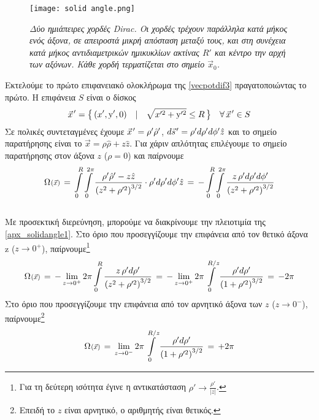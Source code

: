 \begin{figure}[h]
    \centering
    \texttt{[image: solid angle.png]}
    \caption{\textit{Δύο ημιάπειρες χορδές Dirac. Οι χορδές τρέχουν παράλληλα κατά μήκος ενός άξονα, σε απειροστά μικρή απόσταση μεταξύ τους, και στη συνέχεια κατά μήκος αντιδιαμετρικών ημικυκλίων ακτίνας $R '$ και κέντρο την αρχή των αξόνων. Κάθε χορδή τερματίζεται στο σημείο $\vec{x}_0$. %
    }}
    \label{fig:solidangle}
\end{figure}

Εκτελούμε το πρώτο επιφανειακό ολοκλήρωμα της \eqref{vecpotdif3} πραγατοποιώντας το πρώτο. Η επιφάνεια $S$ είναι ο δίσκος
\begin{equation*}
    \pvec{x}' = \big\{ \, (x',\y',0)\quad|\quad \sqrt{x'^2+\y'^2}\le R \, \big\} \quad \forall \, \pvec{x}'\in S
\end{equation*}
Σε πολικές συντεταγμένες έχουμε $\pvec{x}' = \rho'\hat{\rho}'$, %
$d\pvec{s}' = \rho' d\rho' d\phi' \hat{z}$ και το σημείο παρατήρησης είναι το $\vec{x} = \rho\hat{\rho}+z\hat{z}$. Για χάριν απλότητας επιλέγουμε το σημείο παρατήρησης στον άξονα $z$ ($\rho = 0$) και παίρνουμε
\begin{equation}\label{apx_solidangle1}
    \scafun{\Omega}{\vec{x}} \,=\, \int\limits_0^{R}\int\limits_0^{2\pi} \frac{\rho'\hat{\rho}'-z\hat{z}}{\left(z^2+\rho'^2\right)^{3/2}}\cdot \rho'd\rho'd\phi'\hat{z} \,=\, -\int\limits_0^{R}\int\limits_0^{2\pi}\frac{z\,\rho'd\rho'd\phi'}{\left(z^2+\rho'^2\right)^{3/2}}
\end{equation}
\\

Με προσεκτική διερεύνηση, μπορούμε να διακρίνουμε την πλειοτιμία της \eqref{apx_solidangle1}. Στο όριο που προσεγγίζουμε την επιφάνεια από τον θετικό άξονα z ($z\rightarrow 0^+$), παίρνουμε\footnote{Για τη δεύτερη ισότητα έγινε η αντικατάσταση $\rho'\rightarrow\frac{\rho'}{|z|}$.}
\begin{equation}\label{apx_solidangle2}
    \scafun{\Omega}{\vec{x}}\,=\,-\lim\limits_{z\rightarrow 0^+}2\pi\int\limits_0^{R}\frac{z\,\rho'd\rho'}{\left(z^2+\rho'^2\right)^{3/2}} \,=\, -\lim\limits_{z\rightarrow 0^+}2\pi\int\limits_0^{R/z}\frac{\rho'd\rho'}{\left(1+\rho'^2\right)^{3/2}} \,=\, -2\pi
\end{equation}
Στο όριο που προσεγγίζουμε την επιφάνεια από τον αρνητικό άξονα των $z$ ($z\rightarrow 0^-$), παίρνουμε\footnote{Επειδή το $z$ είναι αρνητικό, ο αριθμητής είναι θετικός.} 
\begin{equation}\label{apx_solidangle3}
    \scafun{\Omega}{\vec{x}}\,=\, \lim\limits_{z\rightarrow 0^-}2\pi\int\limits_0^{R/z}\frac{\rho'd\rho'}{\left(1+\rho'^2\right)^{3/2}} \,=\, +2\pi
\end{equation}

